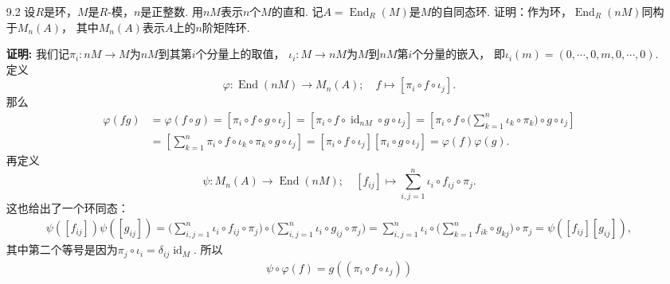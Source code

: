\begin{enumerate}
        \item[9.2]
        设$R$是环，$M$是$R$-模，$n$是正整数.
        用$nM$表示$n$个$M$的直和.
        记$A = \operatorname{End}_{R}(M)$是$M$的自同态环.
        证明：作为环，$\operatorname{End}_{R}(nM)$同构于$M_{n}(A)$，
        其中$M_{n}(A)$表示$A$上的$n$阶矩阵环.
        \item[\textbf{证明:}]
        我们记$\pi_{i}:nM \rightarrow M$为$nM$到其第$i$个分量上的取值，
        $\iota_{i}:M \rightarrow nM$为$M$到$nM$第$i$个分量的嵌入，
        即$\iota_{i}(m) = (0,\cdots,0,m,0,\cdots,0)$.
        定义
        \[\varphi:\operatorname{End}(nM) \rightarrow M_{n}(A);
        \quad f \mapsto [\pi_{i} \circ f \circ \iota_{j}].\]
        那么
        \begin{equation*}\begin{aligned}
            \varphi(fg) &= \varphi(f \circ g)
            = [\pi_{i} \circ f \circ g \circ \iota_{j}]
            = [\pi_{i} \circ f \circ \operatorname{id}_{nM} \circ g \circ \iota_{j}]
            = [\pi_{i} \circ f \circ \bigg(\sum_{k=1}^{n}\iota_{k} \circ \pi_{k}\bigg) \circ g \circ \iota_{j}] \\
            &= [\sum_{k=1}^{n}\pi_{i} \circ f \circ \iota_{k} \circ \pi_{k} \circ g \circ \iota_{j}]
            = [\pi_{i} \circ f \circ \iota_{j}][\pi_{i} \circ g \circ \iota_{j}]
            = \varphi(f)\varphi(g).
        \end{aligned}\end{equation*}
        再定义
        \[\psi:M_{n}(A) \rightarrow \operatorname{End}(nM);
        \quad [f_{ij}] \mapsto \sum\limits_{i,j=1}^{n}\iota_{i} \circ f_{ij} \circ \pi_{j}.\]
        这也给出了一个环同态：
        \begin{equation*}\begin{aligned}
            \psi([f_{ij}])\psi([g_{ij}]) 
            = \bigg(\sum_{i,j=1}^{n}\iota_{i} \circ f_{ij} \circ \pi_{j}\bigg) \circ
            \bigg(\sum_{i,j=1}^{n}\iota_{i} \circ g_{ij} \circ \pi_{j}\bigg)
            = \sum_{i,j=1}^{n}\iota_{i} \circ \bigg(\sum_{k=1}^{n}f_{ik} \circ g_{kj}\bigg) \circ \pi_{j}
            = \psi([f_{ij}][g_{ij}]),
        \end{aligned}\end{equation*}
        其中第二个等号是因为$\pi_{j} \circ \iota_{i} = \delta_{ij}\operatorname{id}_{M}$.
        所以
        \begin{equation*}\begin{aligned}
        \psi \circ \varphi(f) = g((\pi_{i} \circ f \circ \iota_{j})) 

\end{aligned}
\end{equation*}
\end{enumerate}
